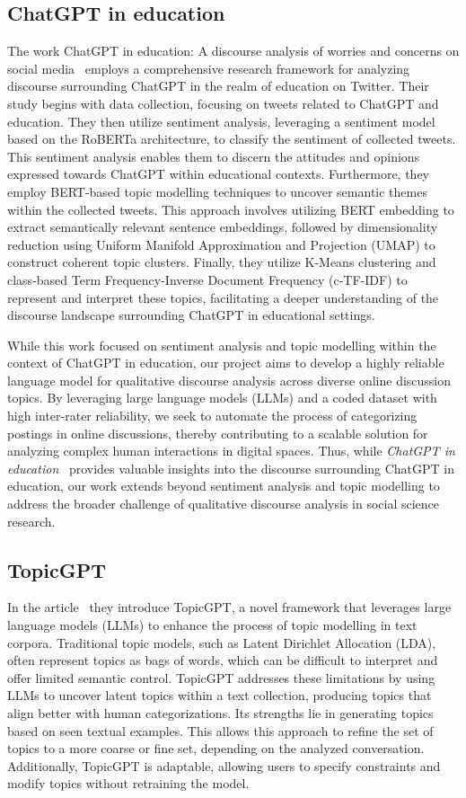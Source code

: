 \documentclass[fleqn,moreauthors,10pt]{ds_report}
\begin{document}
\subsection{ChatGPT in education}
The work ChatGPT in education: A discourse analysis of worries and
concerns on social media~\cite{chatgpt} employs a comprehensive research framework for analyzing discourse surrounding ChatGPT in the realm of education on Twitter. Their study begins with data collection, focusing on tweets related to ChatGPT and education. They then utilize sentiment analysis, leveraging a sentiment model based on the RoBERTa architecture, to classify the sentiment of collected tweets. This sentiment analysis enables them to discern the attitudes and opinions expressed towards ChatGPT within educational contexts. Furthermore, they employ BERT-based topic modelling techniques to uncover semantic themes within the collected tweets. This approach involves utilizing BERT embedding to extract semantically relevant sentence embeddings, followed by dimensionality reduction using Uniform Manifold Approximation and Projection (UMAP) to construct coherent topic clusters. Finally, they utilize K-Means clustering and class-based Term Frequency-Inverse Document Frequency (c-TF-IDF) to represent and interpret these topics, facilitating a deeper understanding of the discourse landscape surrounding ChatGPT in educational settings.

While this work focused on sentiment analysis and topic modelling within the context of ChatGPT in education, our project aims to develop a highly reliable language model for qualitative discourse analysis across diverse online discussion topics. By leveraging large language models (LLMs) and a coded dataset with high inter-rater reliability, we seek to automate the process of categorizing postings in online discussions, thereby contributing to a scalable solution for analyzing complex human interactions in digital spaces. Thus, while \emph{ChatGPT in education}~\cite{chatgpt} provides valuable insights into the discourse surrounding ChatGPT in education, our work extends beyond sentiment analysis and topic modelling to address the broader challenge of qualitative discourse analysis in social science research.

\subsection{TopicGPT}
In the article~\cite{pham2023topicgpt} they introduce TopicGPT, a novel framework that leverages large language models (LLMs) to enhance the process of topic modelling in text corpora. Traditional topic models, such as Latent Dirichlet Allocation (LDA), often represent topics as bags of words, which can be difficult to interpret and offer limited semantic control.
TopicGPT addresses these limitations by using LLMs to uncover latent topics within a text collection, producing topics that align better with human categorizations.
Its strengths lie in generating topics based on seen textual examples. This allows this approach to refine the set of topics to a more coarse or fine set, depending on the analyzed conversation. 
Additionally, TopicGPT is adaptable, allowing users to specify constraints and modify topics without retraining the model.
\end{document}
